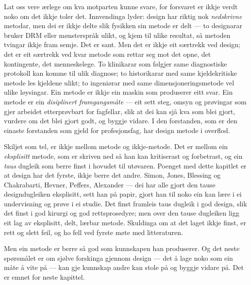 Lat oss vere ærlege om kva motparten kunne svare, for forsvaret er ikkje verdt noko om det ikkje toler det. Innvendinga lyder: design har riktig nok \emph{nedskrivne} metodar, men dei er ikkje delte slik fysikken sin metode er delt — to designarar bruker DRM eller mønsterspråk ulikt, og kjem til ulike resultat, så metoden tvingar ikkje fram semje. Det er sant. Men det er ikkje eit særtrekk ved design; det er eit særtrekk ved kvar metode som rettar seg mot det opne, det kontingente, det menneskelege. To klinikarar som følgjer same diagnostiske protokoll kan komme til ulik diagnose; to historikarar med same kjeldekritiske metode les kjeldene ulikt; to ingeniørar med same dimensjoneringsmetode vel ulike løysingar. Ein metode er ikkje ein maskin som produserer eitt svar. Ein metode er ein \emph{disiplinert framgangsmåte} — eit sett steg, omsyn og prøvingar som gjer arbeidet etterprøvbart for fagfellar, slik at dei kan sjå kva som blei gjort, vurdere om det blei gjort godt, og byggje vidare. I den forstanden, som er den einaste forstanden som gjeld for profesjonsfag, har design metode i overflod.

Skiljet som tel, er ikkje mellom metode og ikkje-metode. Det er mellom ein \emph{eksplisitt} metode, som er skriven ned så han kan kritiserast og forbetrast, og ein \emph{taus} dugleik som berre finst i hovudet til utøvaren. Poenget med dette kapitlet er at design har det fyrste, ikkje berre det andre. Simon, Jones, Blessing og Chakrabarti, Hevner, Peffers, Alexander — dei har alle gjort den tause designdugleiken eksplisitt, sett han på papir, gjort han til noko ein kan lære i ei undervisning og prøve i ei studie. Det finst framleis taus dugleik i god design, slik det finst i god kirurgi og god rettsprosedyre; men over den tause dugleiken ligg eit lag av eksplisitt, delt, lærbar metode. Skuldinga om at det laget ikkje finst, er rett og slett feil, og ho fell ved fyrste møte med litteraturen.

\vignett

Men ein metode er berre så god som kunnskapen han produserer. Og det neste spørsmålet er om sjølve forskinga gjennom design — det å lage noko som ein måte å vite på — kan gje kunnskap andre kan stole på og byggje vidare på. Det er emnet for neste kapittel.


